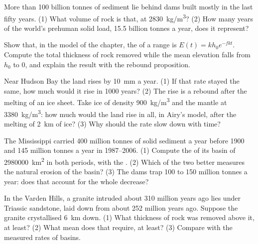 \begin{exercise}[$\star\star$]\label{exo:g12:destruction-of-mountains:11}
More than 100 billion tonnes of sediment lie behind dams built mostly in the
last fifty years. (1) What volume of rock is that, at
\qty{2830}{kg/m^3}? (2) How many years of the world's prehuman solid load,
15.5 billion tonnes a year, does it represent?
\end{exercise}

\begin{exercise}[$\star\star\star$]\label{exo:g12:destruction-of-mountains:12}
Show that, in the model of the chapter, the  of a range is
$E(t) = k h_0 e^{-fkt}$. Compute the total thickness of rock removed while
the mean elevation falls from $h_0$ to 0, and explain the result with the
rebound proposition.
\end{exercise}

\begin{exercise}[$\star\star\star$]\label{exo:g12:destruction-of-mountains:13}
Near Hudson Bay the land rises by \qty{10}{mm} a year. (1) If that rate
stayed the same, how much would it rise in 1000 years? (2) The rise is a
rebound after the melting of an ice sheet. Take ice of density
\qty{900}{kg/m^3} and the mantle at \qty{3380}{kg/m^3}: how much would the
land rise in all, in Airy's model, after the melting of \qty{2}{km} of ice?
(3) Why should the rate slow down with time?
\end{exercise}

\begin{exercise}[$\star\star\star$]\label{exo:g12:destruction-of-mountains:14}
The Mississippi carried 400 million tonnes of solid sediment a year before
1900 and 145 million tonnes a year in 1987--2006. (1) Compute the
 of its basin of \qty{2980000}{km^2} in both periods, with the
. (2) Which of the two better measures the natural erosion of
the basin? (3) The dams trap 100 to 150 million tonnes a year: does that
account for the whole decrease?
\end{exercise}

\begin{exercise}[$\star\star\star$]\label{exo:g12:destruction-of-mountains:15}
In the Varden Hills, a granite intruded about 310 million years ago lies
under Triassic sandstone, laid down from about 252 million years ago.
Suppose the granite crystallised \qty{6}{km} down. (1) What thickness of rock
was removed above it, at least? (2) What mean  does that
require, at least? (3) Compare with the measured rates of basins.
\end{exercise}

